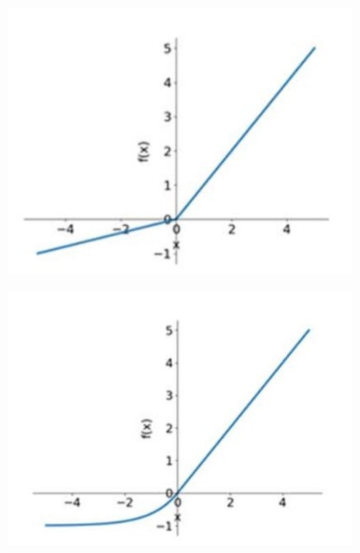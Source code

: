 \begin{figure}[h!]
	\medskip
	
	\begin{subfigure}{0.22\textwidth}
		\includegraphics[width=\linewidth]{Images/DataMining/PReLUFunction}
		\caption{}    %
		\label{subfig:PReLU}
	\end{subfigure}
	\hfill
	\begin{subfigure}{0.22\textwidth}
		\includegraphics[width=\linewidth]{Images/DataMining/ELUFunction}
		\caption{}    %
		\label{subfig:ELU}
	\end{subfigure}
	\hfill
	\begin{subfigure}{0.22\textwidth}

\end{subfigure}
\end{figure}
